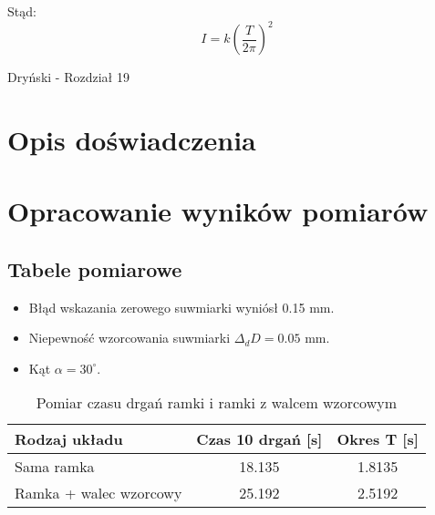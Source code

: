 \documentclass[a4paper,12pt]{article}
\begin{document}
Stąd:
\begin{equation} \label{eq:moment_bezwladnosci_w_zaleznosci_od_okresu}
    I = k \left(\frac{T}{2\pi}\right)^2
\end{equation}

Dryński - Rozdział 19
\section{Opis doświadczenia}




\section{Opracowanie wyników pomiarów}

\subsection{Tabele pomiarowe}

\begin{itemize}
    \item Błąd wskazania zerowego suwmiarki wyniósł 0.15 mm.
    \item Niepewność wzorcowania suwmiarki $\Delta_d D = 0.05$ mm.
    \item Kąt $\alpha = 30^\circ$.
\end{itemize}

\begin{table}[H]
    \centering
    \begin{tabular}{|l|c|c|}
        \hline
        \textbf{Rodzaj układu} & \textbf{Czas 10 drgań [s]} & \textbf{Okres T [s]} \\
        \hline
        Sama ramka & 18.135 & 1.8135 \\
        \hline
        Ramka + walec wzorcowy & 25.192 & 2.5192 \\
        \hline
    \end{tabular}
    \caption{Pomiar czasu drgań ramki i ramki z walcem wzorcowym}
    \label{tab:pomiar_czasu_drgan_ramki_z_walcem}
\end{table}
\end{document}
